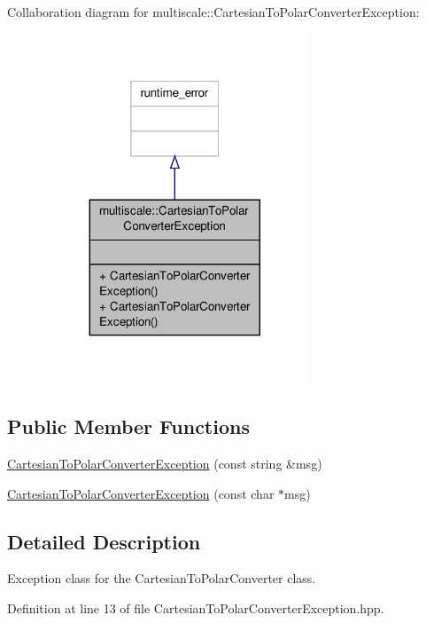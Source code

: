 Collaboration diagram for multiscale\-:\-:Cartesian\-To\-Polar\-Converter\-Exception\-:\nopagebreak
\begin{figure}[H]
\begin{center}
\leavevmode
\includegraphics[width=224pt]{classmultiscale_1_1CartesianToPolarConverterException__coll__graph}
\end{center}
\end{figure}
\subsection*{Public Member Functions}
\begin{DoxyCompactItemize}
\item 
\hyperlink{classmultiscale_1_1CartesianToPolarConverterException_a45f642fecefc7e3b184731767c595916}{Cartesian\-To\-Polar\-Converter\-Exception} (const string \&msg)
\item 
\hyperlink{classmultiscale_1_1CartesianToPolarConverterException_a06b8284c08f7074583d78428bd3ff2d7}{Cartesian\-To\-Polar\-Converter\-Exception} (const char $\ast$msg)
\end{DoxyCompactItemize}


\subsection{Detailed Description}
Exception class for the Cartesian\-To\-Polar\-Converter class. 

Definition at line 13 of file Cartesian\-To\-Polar\-Converter\-Exception.\-hpp.



